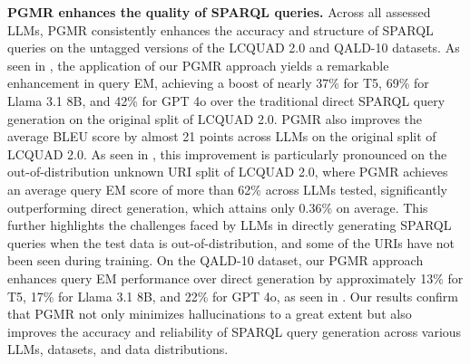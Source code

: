 \noindent \textbf{PGMR enhances the quality of SPARQL queries.}
Across all assessed LLMs, PGMR consistently enhances the accuracy and structure of SPARQL queries on the untagged versions of the LCQUAD 2.0 and QALD-10 datasets. As seen in , the application of our PGMR approach yields a remarkable enhancement in query EM, achieving a boost of nearly 37\% for T5, 69\% for Llama 3.1 8B, and 42\% for GPT 4o over the traditional direct SPARQL query generation on the original split of LCQUAD 2.0. PGMR also improves the average BLEU score by almost 21 points across LLMs on the original split of LCQUAD 2.0.
As seen in , this improvement is particularly pronounced on the out-of-distribution unknown URI split of LCQUAD 2.0, where PGMR achieves an average query EM score of more than 62\% across LLMs tested, significantly outperforming direct generation, which attains only 0.36\% on average.
This further highlights the challenges faced by LLMs in directly generating SPARQL queries when the test data is out-of-distribution, and some of the URIs have not been seen during training.
On the QALD-10 dataset, our PGMR approach enhances query EM performance over direct generation by approximately 13\% for T5, 17\% for Llama 3.1 8B, and 22\% for GPT 4o, as seen in .
Our results confirm that PGMR not only minimizes hallucinations to a great extent but also improves the accuracy and reliability of SPARQL query generation across various LLMs, datasets, and data distributions.







